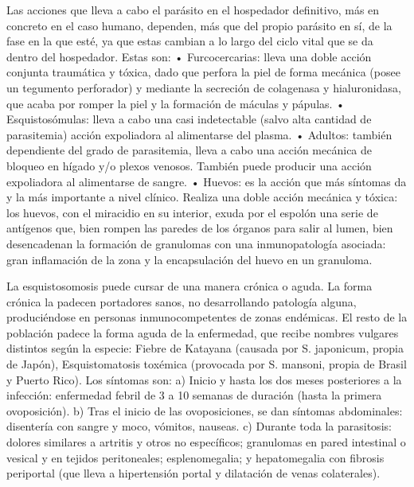 Las acciones que lleva a cabo el parásito en el hospedador definitivo, más en concreto en el caso humano, dependen, más que del propio parásito en sí, de la fase en la que esté, ya que estas cambian a lo largo del ciclo vital que se da dentro del hospedador. Estas son:
• Furcocercarias: lleva una doble acción conjunta traumática y tóxica, dado que perfora la piel de forma mecánica (posee un tegumento perforador) y mediante la secreción de colagenasa y hialuronidasa, que acaba por romper la piel y la formación de máculas y pápulas.
• Esquistosómulas: lleva a cabo una casi indetectable (salvo alta cantidad de parasitemia) acción expoliadora al alimentarse del plasma.
• Adultos: también dependiente del grado de parasitemia, lleva a cabo una acción mecánica de bloqueo en hígado y/o plexos venosos. También puede producir una acción expoliadora al alimentarse de sangre.
• Huevos: es la acción que más síntomas da y la más importante a nivel clínico. Realiza una doble acción mecánica y tóxica: los huevos, con el miracidio en su interior, exuda por el espolón una serie de antígenos que, bien rompen las paredes de los órganos para salir al lumen, bien desencadenan la formación de granulomas con una inmunopatología asociada: gran inflamación de la zona y la encapsulación del huevo en un granuloma.

La esquistosomosis puede cursar de una manera crónica o aguda. La forma crónica la padecen portadores sanos, no desarrollando patología alguna, produciéndose en personas inmunocompetentes de zonas endémicas. El resto de la población padece la forma aguda de la enfermedad, que recibe nombres vulgares distintos según la especie: Fiebre de Katayana (causada por S. japonicum, propia de Japón), Esquistomatosis toxémica (provocada por S. mansoni, propia de Brasil y Puerto Rico). Los síntomas son:
a) Inicio y hasta los dos meses posteriores a la infección: enfermedad febril de 3 a 10 semanas de duración (hasta la primera ovoposición).
b) Tras el inicio de las ovoposiciones, se dan síntomas abdominales: disentería con sangre y moco, vómitos, nauseas.
c) Durante toda la parasitosis: dolores similares a artritis y otros no específicos; granulomas en pared intestinal o vesical y en tejidos peritoneales; esplenomegalia; y hepatomegalia con fibrosis periportal (que lleva a hipertensión portal y dilatación de venas colaterales).

